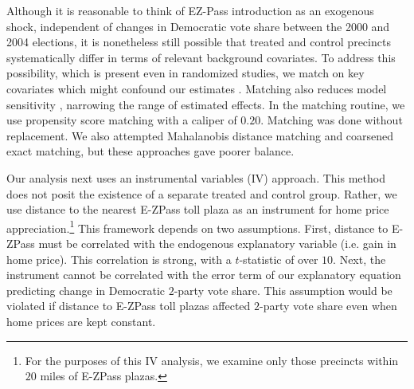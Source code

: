 Although it is reasonable to think of EZ-Pass introduction as an exogenous shock, independent of changes in Democratic vote share between the 2000 and 2004 elections, it is nonetheless still possible that treated and control precincts systematically differ in terms of relevant background covariates. To address this possibility, which is present even in randomized studies, we match on key covariates which might confound our estimates \parencite{Morgan2012}. Matching also reduces model sensitivity \parencite{Ho2007}, narrowing the range of estimated effects. In the matching routine, we use propensity score matching with a caliper of $0.20$. Matching was done without replacement. We also attempted Mahalanobis distance matching and coarsened exact matching, but these approaches gave poorer balance.

Our analysis next uses an instrumental variables (IV) approach. This method does not posit the existence of a separate treated and control group. Rather, we use distance to the nearest E-ZPass toll plaza as an instrument for home price appreciation.\footnote{For the purposes of this IV analysis, we examine only those precincts within $20$ miles of E-ZPass plazas.} This framework depends on two assumptions. First, distance to E-ZPass must be correlated with the endogenous explanatory variable (i.e. gain in home price). This correlation is strong, with a $t$-statistic of over $10$. Next, the instrument cannot be correlated with the error term of our explanatory equation predicting change in Democratic $2$-party vote share. This assumption would be violated if distance to E-ZPass toll plazas affected $2$-party vote share even when home prices are kept constant. 

